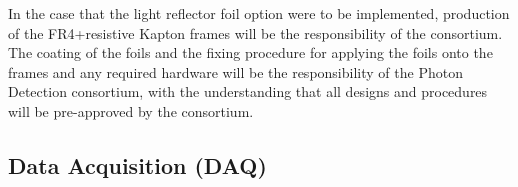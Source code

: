 In the case that the light reflector foil option were to be implemented, production of the FR4+resistive Kapton  frames will be the responsibility of the  consortium.
The  coating of the  foils and the fixing procedure for applying the  foils onto the  frames and any required hardware will be the responsibility of the Photon Detection consortium, with the understanding that all designs and procedures will be pre-approved by the  consortium. 



\subsection{Data Acquisition (DAQ)}
\label{sec:fdsp-pd-intfc-daq}




